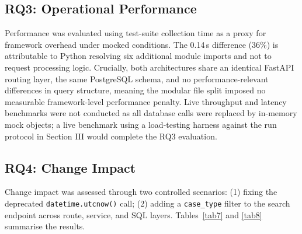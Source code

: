﻿\documentclass[conference]{IEEEtran}
\begin{document}

\subsection*{RQ3: Operational Performance}

Performance was evaluated using test-suite collection time as a proxy for framework overhead under mocked conditions. The 0.14\,s difference (36\%) is attributable to Python resolving six additional module imports and not to request processing logic. Crucially, both architectures share an identical FastAPI routing layer, the same PostgreSQL schema, and no performance-relevant differences in query structure, meaning the modular file split imposed no measurable framework-level performance penalty. Live throughput and latency benchmarks were not conducted as all database calls were replaced by in-memory mock objects; a live benchmark using a load-testing harness against the run protocol in Section III would complete the RQ3 evaluation.

\subsection*{RQ4: Change Impact}

Change impact was assessed through two controlled scenarios: (1) fixing the deprecated \texttt{datetime.utcnow()} call; (2) adding a \texttt{case\_type} filter to the search endpoint across route, service, and SQL layers. Tables~\ref{tab7} and \ref{tab8} summarise the results.
\end{document}
